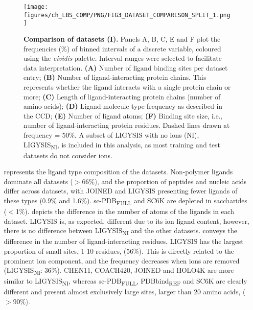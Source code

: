 \begin{figure}[ht!]
    \centering
    \texttt{[image: figures/ch\_LBS\_COMP/PNG/FIG3\_DATASET\_COMPARISON\_SPLIT\_1.png]}
    \caption[Comparison of datasets (I)]{\textbf{Comparison of datasets (I).} Panels A, B, C, E and F plot the frequencies (\%) of binned intervals of a discrete variable, coloured using the \textit{cividis} palette. Interval ranges were selected to facilitate data interpretation. \textbf{(A)} Number of ligand binding sites per dataset entry; \textbf{(B)} Number of ligand-interacting protein chains. This represents whether the ligand interacts with a single protein chain or more; \textbf{(C)} Length of ligand-interacting protein chains (number of amino acids); \textbf{(D)} Ligand molecule type frequency as described in the CCD; \textbf{(E)} Number of ligand atoms; \textbf{(F)} Binding site size, i.e., number of ligand-interacting protein residues. Dashed lines drawn at frequency = 50\%. A subset of LIGYSIS with no ions (NI), LIGYSIS\textsubscript{NI}, is included in this analysis, as most training and test datasets do not consider ions.}
    \label{fig:dataset_comp_1}
\end{figure}

 represents the ligand type composition of the datasets. Non-polymer ligands dominate all datasets ($>$66\%), and the proportion of peptides and nucleic acids differ across datasets, with JOINED and LIGYSIS presenting fewer ligands of these types (0.9\% and 1.6\%). sc-PDB\textsubscript{FULL} and SC6K are depleted in saccharides ($<$1\%).  depicts the difference in the number of atoms of the ligands in each dataset. LIGYSIS is, as expected, different due to its ion ligand content, however, there is no difference between LIGYSIS\textsubscript{NI} and the other datasets.  conveys the difference in the number of ligand-interacting residues. LIGYSIS has the largest proportion of small sites, 1-10 residues, (56\%). This is directly related to the prominent ion component, and the frequency decreases when ions are removed (LIGYSIS\textsubscript{NI}: 36\%). CHEN11, COACH420, JOINED and HOLO4K are more similar to LIGYSIS\textsubscript{NI}, whereas sc-PDB\textsubscript{FULL}, PDBbind\textsubscript{REF} and SC6K are clearly different and present almost exclusively large sites, larger than 20 amino acids, ($>$90\%).

